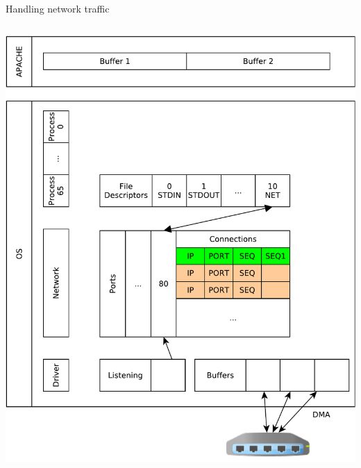 \documentclass{beamer}
\begin{document}
\begin{frame}[fragile]{Handling network traffic}
\begin{columns}
\begin{column}[t]{0.5\textwidth}
\begin{center}
{  \includegraphics[width=1\linewidth]{sock_mem_8}
     }
\end{center}
\end{column}
\end{columns}
\end{frame}
\end{document}
